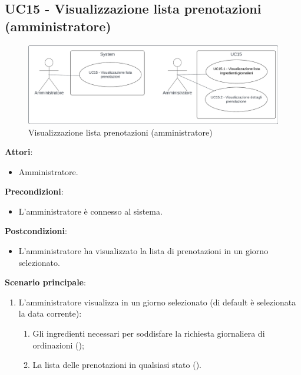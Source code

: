 \subsection{UC15 - Visualizzazione lista prenotazioni (amministratore)} \label{usecase:15}
\begin{figure}[H]
    \centering
    \includegraphics[width=0.9\linewidth]{ucd/ucd15.png}
    \caption{Visualizzazione lista prenotazioni (amministratore)}
\end{figure}
\textbf{Attori}:
\begin{itemize}
    \item Amministratore.
\end{itemize}
\textbf{Precondizioni}:
\begin{itemize}
    \item L'amministratore è connesso al sistema.
\end{itemize}
\textbf{Postcondizioni}:
\begin{itemize}
    \item L'amministratore ha visualizzato la lista di prenotazioni in un giorno selezionato.
\end{itemize}
\textbf{Scenario principale}:
\begin{enumerate}
   \item L'amministratore visualizza in un giorno selezionato (di default è selezionata la data corrente):
   \begin{enumerate}
       \item Gli ingredienti necessari per soddisfare la richiesta giornaliera di ordinazioni ();
       \item La lista delle prenotazioni in qualsiasi stato
       ().
   \end{enumerate}
\end{enumerate}

